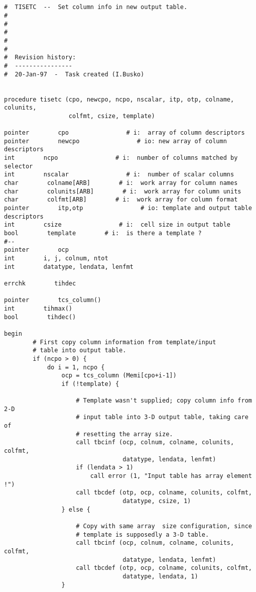\begin{verbatim}


#  TISETC  --  Set column info in new output table.
#
#
#
#
#
#  Revision history:
#  ----------------
#  20-Jan-97  -  Task created (I.Busko)


procedure tisetc (cpo, newcpo, ncpo, nscalar, itp, otp, colname, colunits, 
                  colfmt, csize, template)

pointer        cpo                # i:  array of column descriptors 
pointer        newcpo                # io: new array of column descriptors 
int        ncpo                # i:  number of columns matched by selector
int        nscalar                # i:  number of scalar columns
char        colname[ARB]        # i:  work array for column names
char        colunits[ARB]        # i:  work array for column units
char        colfmt[ARB]        # i:  work array for column format
pointer        itp,otp                # io: template and output table descriptors
int        csize                # i:  cell size in output table
bool        template        # i:  is there a template ?
#--
pointer        ocp
int        i, j, colnum, ntot
int        datatype, lendata, lenfmt

errchk        tihdec

pointer        tcs_column()
int        tihmax()
bool        tihdec()

begin
        # First copy column information from template/input 
        # table into output table.
        if (ncpo > 0) {
            do i = 1, ncpo {
                ocp = tcs_column (Memi[cpo+i-1])
                if (!template) {

                    # Template wasn't supplied; copy column info from 2-D 
                    # input table into 3-D output table, taking care of 
                    # resetting the array size. 
                    call tbcinf (ocp, colnum, colname, colunits, colfmt, 
                                 datatype, lendata, lenfmt)
                    if (lendata > 1)
                        call error (1, "Input table has array element !")
                    call tbcdef (otp, ocp, colname, colunits, colfmt, 
                                 datatype, csize, 1)
                } else {

                    # Copy with same array  size configuration, since
                    # template is supposedly a 3-D table.
                    call tbcinf (ocp, colnum, colname, colunits, colfmt, 
                                 datatype, lendata, lenfmt)
                    call tbcdef (otp, ocp, colname, colunits, colfmt, 
                                 datatype, lendata, 1)
                }


\end{verbatim}
